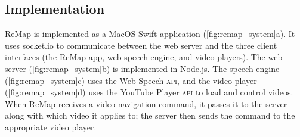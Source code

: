 \subsection{Implementation}
ReMap is implemented as a MacOS Swift application (\autoref{fig:remap_system}a). It uses socket.io to communicate between the web server and the three client interfaces (the ReMap app, web speech engine, and video players). The web server (\autoref{fig:remap_system}b) is implemented in Node.js. The speech engine (\autoref{fig:remap_system}c) uses the Web Speech \textsc{api}, and the video player (\autoref{fig:remap_system}d) uses the YouTube Player \textsc{api} to load and control videos. When ReMap receives a video navigation command, it passes it to the server along with which video it applies to; the server then sends the command to the appropriate video player.

